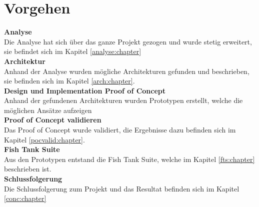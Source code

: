 \section{Vorgehen}
\label{intro:vorgehen}

\begin{comment}
	Die Arbeit ist grob in zwei Teile unterteilt. Beim ersten Teil, dem Proof of Concept, wird analysiert, wie die Aufgabe theoretisch und praktisch gelöst werden kann. Zu Beweis- und Demonstrationszwecken wurden Prototypen entwickelt. Beim zweiten Teil handelt es sich grundsätzlich um ein Software Engineering Projekt (Fish Tank Suite). In diesem Teil wird die ausgearbeitete Theorie aus dem Proof of Concept in ein praktikables System überführt. Das Software Engineering Projekt kann trotzdem Problemlösungen beinhalten, für die eine Analyse notwendig war, da die Prototypen aus dem Proof of Concept nur ein vertikaler Schnitt durch alle Layer der einzelen Systeme sind.
\end{comment}
\textbf{Analyse} \\
Die Analyse hat sich über das ganze Projekt gezogen und wurde stetig erweitert, sie befindet sich im Kapitel \ref{analyse:chapter} \\
\textbf{Architektur} \\
Anhand der Analyse wurden mögliche Architekturen gefunden und beschrieben, sie befinden sich im Kapitel \ref{arch:chapter}.\\
\textbf{Design und Implementation Proof of Concept} \\
Anhand der gefundenen Architekturen wurden Prototypen erstellt, welche die möglichen Ansätze aufzeigen \\
\textbf{Proof of Concept validieren} \\
Das Proof of Concept wurde validiert, die Ergebnisse dazu befinden sich im Kapitel \ref{pocvalid:chapter}.\\
\textbf{Fish Tank Suite} \\
Aus den Prototypen entstand die Fish Tank Suite, welche im Kapitel \ref{fts:chapter} beschrieben ist. \\
\textbf{Schlussfolgerung} \\
Die Schlussfolgerung zum Projekt und das Resultat befinden sich im Kapitel \ref{conc:chapter}